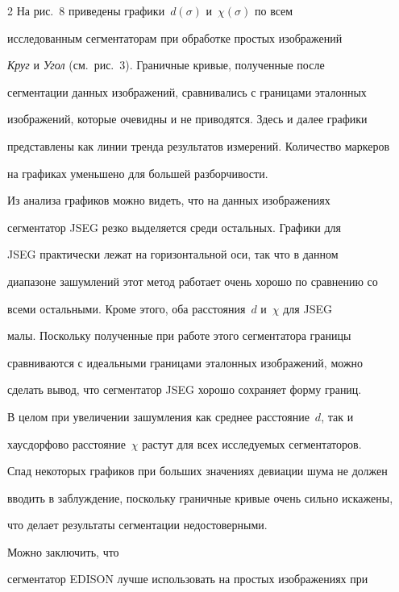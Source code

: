 \begin{multicols}{2}
  На рис.~8 приведены графики~$d(\sigma)$ и~$\chi(\sigma)$ по всем 


исследованным сегментаторам при обработке простых изображений 


\textit{Круг} и \textit{Угол} (см.\ рис.~3). Граничные кривые, полученные после 


сегментации данных изображений, сравнивались с границами эталонных 


изображений, которые очевидны и не приводятся. Здесь и далее графики 


представлены как линии тренда результатов измерений. Количество маркеров 


на графиках уменьшено для большей разборчивости.


  


  Из анализа графиков можно видеть, что на данных изображениях 


сегментатор {JSEG} резко выделяется среди остальных. Графики для 


{JSEG} практически лежат на горизонтальной оси, так что в данном 


диапазоне зашумлений этот метод работает очень хорошо по сравнению со 


всеми остальными. Кроме этого, оба расстояния~$d$ и~$\chi$ для {JSEG} 


малы. Поскольку полученные при работе этого сегментатора границы 


сравниваются с идеальными границами эталонных изображений, можно 


сделать вывод, что сегментатор {JSEG} хорошо сохраняет форму границ.


  


  В целом при увеличении зашумления как среднее расстояние~$d$, так и 


хаусдорфово расстояние~$\chi$ растут для всех исследуемых сегментаторов. 


Спад некоторых графиков при больших значениях девиации шума не должен 


вводить в заблуждение, поскольку граничные кривые очень сильно искажены, 


что делает результаты сегментации недостоверными. 





Можно заключить, что 


сегментатор {EDISON} лучше использовать на простых изображениях при 



\end{multicols}
